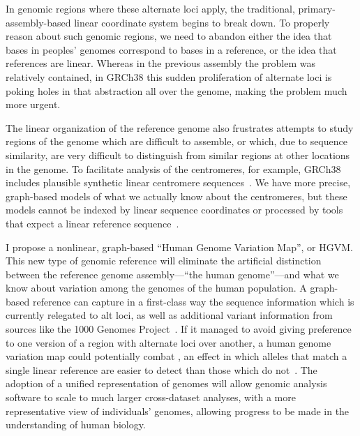 
In genomic regions where these alternate loci apply, the traditional, primary-assembly-based linear coordinate system begins to break down. To properly reason about such genomic regions, we need to abandon either the idea that bases in peoples' genomes correspond to bases in a reference, or the idea that references are linear. Whereas in the previous assembly the problem was relatively contained, in GRCh38 this sudden proliferation of alternate loci is poking holes in that abstraction all over the genome, making the problem much more urgent.

The linear organization of the reference genome also frustrates attempts to study regions of the genome which are difficult to assemble, or which, due to sequence similarity, are very difficult to distinguish from similar regions at other locations in the genome. To facilitate analysis of the centromeres, for example, GRCh38 includes plausible synthetic linear centromere sequences~\cite{karolchik2014new}. We have more precise, graph-based models of what we actually know about the centromeres, but these models cannot be indexed by linear sequence coordinates or processed by tools that expect a linear reference sequence~\cite{miga2014centromere}.

\begin{sloppypar}
I propose a nonlinear, graph-based ``Human Genome Variation Map'', or HGVM. This new type of genomic reference will eliminate the artificial distinction between the reference genome assembly---``the human genome''---and what we know about variation among the genomes of the human population. A graph-based reference can capture in a first-class way the sequence information which is currently relegated to alt loci, as well as additional variant information from sources like the 1000 Genomes Project~\cite{10002015global}. If it managed to avoid giving preference to one version of a region with alternate loci over another, a human genome variation map could potentially combat , an effect in which alleles that match a single linear reference are easier to detect than those which do not~\cite{degner2009effect,brandt2015mapping}. The adoption of a unified representation of genomes will allow genomic analysis software to scale to much larger cross-dataset analyses, with a more representative view of individuals' genomes, allowing progress to be made in the understanding of human biology.
\end{sloppypar}

